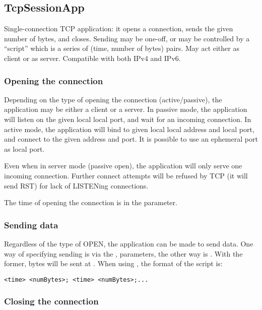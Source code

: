 \subsection{TcpSessionApp}
\label{sec:apps:tcpsessionapp}

Single-connection TCP application: it opens a connection, sends the given number
of bytes, and closes. Sending may be one-off, or may be controlled by a
``script'' which is a series of (time, number of bytes) pairs. May act either as
client or as server. Compatible with both IPv4 and IPv6.

\subsubsection*{Opening the connection}

Depending on the type of opening the connection (active/passive), the
application may be either a client or a server. In passive mode,
the application will listen on the given local local port, and wait for an
incoming connection. In active mode, the application will bind
to given local local address and local port, and connect to the
given address and port. It is possible to use an ephemeral port as
local port.

Even when in server mode (passive open), the application will only
serve one incoming connection. Further connect attempts will be
refused by TCP (it will send RST) for lack of LISTENing connections.

The time of opening the connection is in the  parameter.

\subsubsection*{Sending data}

Regardless of the type of OPEN, the application can be made to send
data. One way of specifying sending is via the , 
parameters, the other way is . With the former,
 bytes will be sent at . When using
, the format of the script is:

\begin{verbatim}
<time> <numBytes>; <time> <numBytes>;...
\end{verbatim}

\subsubsection*{Closing the connection}

